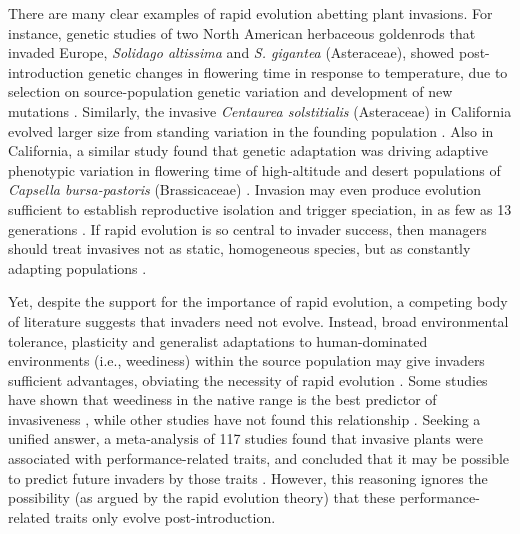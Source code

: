 \documentclass[12pt]{article}\usepackage[]{graphicx}\usepackage[]{color}
\begin{document}
	There are many clear examples of rapid evolution abetting plant invasions. For instance, genetic studies of two North American herbaceous goldenrods that invaded Europe, \textit{Solidago altissima} and \textit{S. gigantea} (Asteraceae), showed post-introduction genetic changes in flowering time in response to temperature, due to selection on source-population genetic variation and development of new mutations \parencite{Weber1998}. Similarly, the invasive \textit{Centaurea solstitialis} (Asteraceae) in California evolved larger size from standing variation in the founding population \parencite{Barker2017}. Also in California, a similar study found that genetic adaptation was driving adaptive phenotypic variation in flowering time of high-altitude and desert populations of \textit{Capsella bursa-pastoris} (Brassicaceae) \parencite{Linde2001}. Invasion may even produce evolution sufficient to establish reproductive isolation and trigger speciation, in as few as 13 generations \parencite{Hendry2000}. If rapid evolution is so central to invader success, then managers should treat invasives not as static, homogeneous species, but as constantly adapting populations \parencite{Lee2002invasion}. %
	
	Yet, despite the support for the importance of rapid evolution, a competing body of literature suggests that invaders need not evolve. Instead,  broad environmental tolerance, plasticity and generalist adaptations to human-dominated environments (i.e., weediness) within the source population may give invaders sufficient advantages, obviating the necessity of rapid evolution \parencite{Richards2006,Schwartz1994,Bock2015,Rejmanek1996,Baker1965}. %
	Some studies have shown that weediness in the native range is the best predictor of invasiveness %
	\parencite[e.g.,][]{Maillet2000}, while other studies have not found this relationship \parencite{Perrins1992,Mack1996}. Seeking a unified answer, a meta-analysis of 117 studies found that invasive plants were associated with performance-related traits, and concluded that it may be possible to predict future invaders by those traits \parencite{VanKleunen2010}. However, this reasoning ignores the possibility (as argued by the rapid evolution theory) that these performance-related traits only evolve post-introduction. 
	
\end{document}
